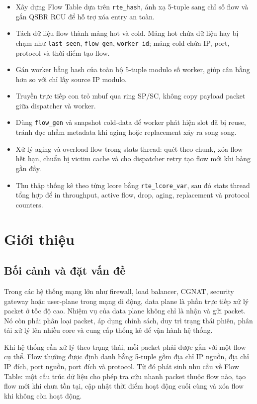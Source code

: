 \documentclass[12pt,a4paper]{report}
\DeclareRobustCommand{\code}[1]{{\small\texttt{#1}}}
\begin{document}
\begin{itemize}
    \item Xây dựng Flow Table dựa trên \code{rte\_hash}, ánh xạ 5-tuple sang chỉ số flow và gắn QSBR RCU để hỗ trợ xóa entry an toàn.
    \item Tách dữ liệu flow thành mảng hot và cold. Mảng hot chứa dữ liệu hay bị chạm như \code{last\_seen}, \code{flow\_gen}, \code{worker\_id}; mảng cold chứa IP, port, protocol và thời điểm tạo flow.
    \item Gán worker bằng hash của toàn bộ 5-tuple modulo số worker, giúp cân bằng hơn so với chỉ lấy source IP modulo.
    \item Truyền trực tiếp con trỏ mbuf qua ring SP/SC, không copy payload packet giữa dispatcher và worker.
    \item Dùng \code{flow\_gen} và snapshot cold-data để worker phát hiện slot đã bị reuse, tránh đọc nhầm metadata khi aging hoặc replacement xảy ra song song.
    \item Xử lý aging và overload flow trong stats thread: quét theo chunk, xóa flow hết hạn, chuẩn bị victim cache và cho dispatcher retry tạo flow mới khi bảng gần đầy.
    \item Thu thập thống kê theo từng lcore bằng \code{rte\_lcore\_var}, sau đó stats thread tổng hợp để in throughput, active flow, drop, aging, replacement và protocol counters.
\end{itemize}

\tableofcontents
\listoffigures
\listoftables

\chapter{Giới thiệu}

\section{Bối cảnh và đặt vấn đề}

Trong các hệ thống mạng lớn như firewall, load balancer, CGNAT, security gateway hoặc user-plane trong mạng di động, data plane là phần trực tiếp xử lý packet ở tốc độ cao. Nhiệm vụ của data plane không chỉ là nhận và gửi packet. Nó còn phải phân loại packet, áp dụng chính sách, duy trì trạng thái phiên, phân tải xử lý lên nhiều core và cung cấp thống kê để vận hành hệ thống.

Khi hệ thống cần xử lý theo trạng thái, mỗi packet phải được gắn với một flow cụ thể. Flow thường được định danh bằng 5-tuple gồm địa chỉ IP nguồn, địa chỉ IP đích, port nguồn, port đích và protocol. Từ đó phát sinh nhu cầu về Flow Table: một cấu trúc dữ liệu cho phép tra cứu nhanh packet thuộc flow nào, tạo flow mới khi chưa tồn tại, cập nhật thời điểm hoạt động cuối cùng và xóa flow khi không còn hoạt động.
\end{document}
